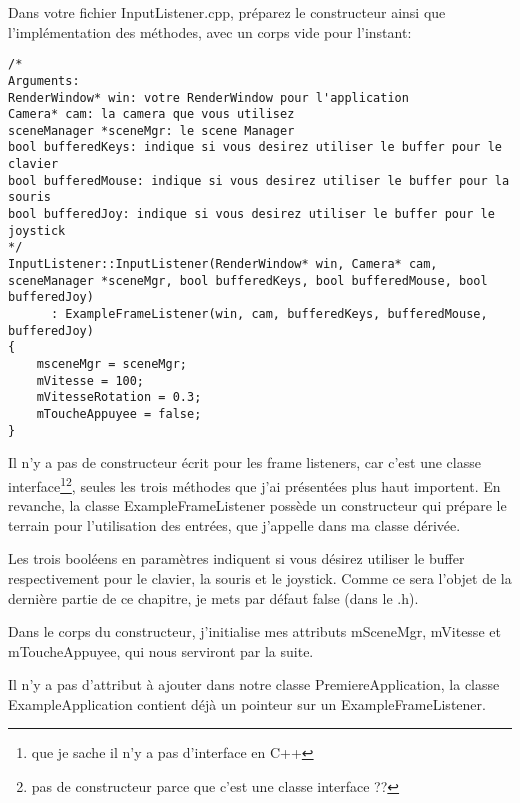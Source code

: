 Dans votre fichier InputListener.cpp, préparez le constructeur ainsi que l'implémentation des méthodes, avec un corps vide pour l'instant:

\begin{lstlisting}[caption={InputListener.cpp}]
/*
Arguments:
RenderWindow* win: votre RenderWindow pour l'application
Camera* cam: la camera que vous utilisez
sceneManager *sceneMgr: le scene Manager
bool bufferedKeys: indique si vous desirez utiliser le buffer pour le clavier
bool bufferedMouse: indique si vous desirez utiliser le buffer pour la souris
bool bufferedJoy: indique si vous desirez utiliser le buffer pour le joystick
*/
InputListener::InputListener(RenderWindow* win, Camera* cam, sceneManager *sceneMgr, bool bufferedKeys, bool bufferedMouse, bool bufferedJoy) 
      : ExampleFrameListener(win, cam, bufferedKeys, bufferedMouse, bufferedJoy)
{
    msceneMgr = sceneMgr;
    mVitesse = 100;
    mVitesseRotation = 0.3;
    mToucheAppuyee = false;
}
\end{lstlisting}



Il n'y a pas de constructeur écrit pour les frame listeners, car c'est une classe interface\footnote{que je sache il n'y a pas d'interface en C++}\footnote{pas de constructeur parce que c'est une classe interface ??}, seules les trois méthodes que j'ai présentées plus haut importent. En revanche, la classe ExampleFrameListener possède un constructeur qui prépare le terrain pour l'utilisation des entrées, que j'appelle dans ma classe dérivée. 

Les trois booléens en paramètres indiquent si vous désirez utiliser le buffer respectivement pour le clavier, la souris et le joystick. Comme ce sera l'objet de la dernière partie de ce chapitre, je mets par défaut false (dans le .h).

Dans le corps du constructeur, j'initialise mes attributs mSceneMgr, mVitesse et mToucheAppuyee, qui nous serviront par la suite.

Il n'y a pas d'attribut à ajouter dans notre classe PremiereApplication, la classe ExampleApplication contient déjà un pointeur sur un ExampleFrameListener.

       




































